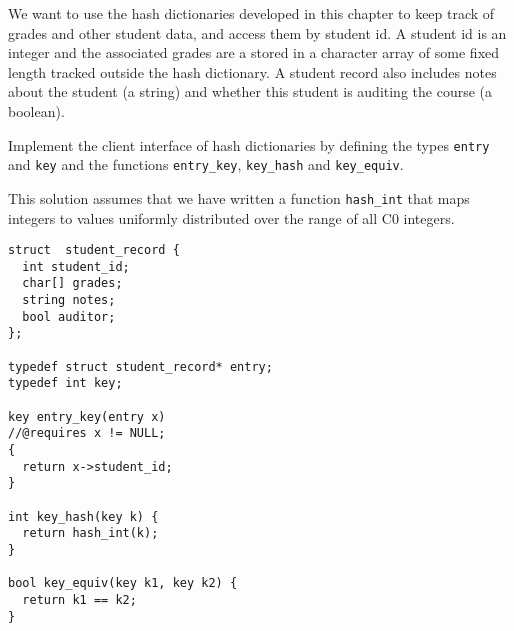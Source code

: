 \begin{flex}
\begin{exercise}%
\label{ex:hdict_student-dict}
  We want to use the hash dictionaries developed in this chapter to
  keep track of grades and other student data, and access them by
  student id.  A student id is an integer and the associated grades
  are a stored in a character array of some fixed length tracked
  outside the hash dictionary.  A student record also includes notes
  about the student (a string) and whether this student is auditing
  the course (a boolean).

  Implement the client interface of hash dictionaries by defining the
  types \lstinline'entry' and \lstinline'key' and the functions
  \lstinline'entry_key', \lstinline'key_hash' and
  \lstinline'key_equiv'.
\end{exercise}

\begin{solution}
\label{ex:hdict_student-dict-solved}
This solution assumes that we have written a function
\lstinline'hash_int' that maps integers to values uniformly
distributed over the range of all C0 integers.
\begin{lstlisting}[language={[C0]C}]
struct  student_record {
  int student_id;
  char[] grades;
  string notes;
  bool auditor;
};

typedef struct student_record* entry;
typedef int key;

key entry_key(entry x)
//@requires x != NULL;
{
  return x->student_id;
}

int key_hash(key k) {
  return hash_int(k);
}

bool key_equiv(key k1, key k2) {
  return k1 == k2;
}
\end{lstlisting}
\end{solution}
\end{flex}


